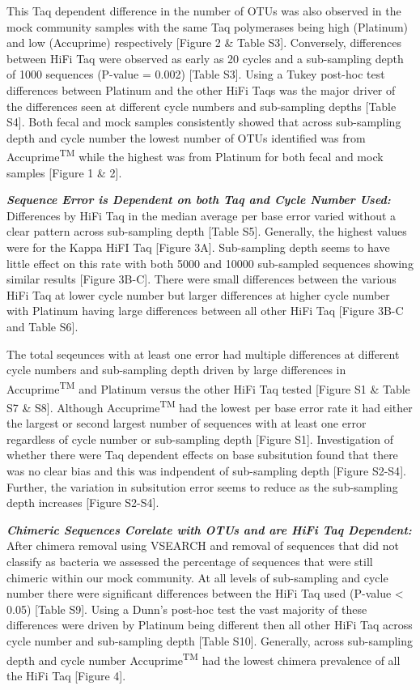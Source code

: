\documentclass[12pt,]{article}
\begin{document}
This Taq dependent difference in the number of OTUs was also observed in
the mock community samples with the same Taq polymerases being high
(Platinum) and low (Accuprime) respectively {[}Figure 2 \& Table S3{]}.
Conversely, differences between HiFi Taq were observed as early as 20
cycles and a sub-sampling depth of 1000 sequences (P-value = 0.002)
{[}Table S3{]}. Using a Tukey post-hoc test differences between Platinum
and the other HiFi Taqs was the major driver of the differences seen at
different cycle numbers and sub-sampling depths {[}Table S4{]}. Both
fecal and mock samples consistently showed that across sub-sampling
depth and cycle number the lowest number of OTUs identified was from
Accuprime\textsuperscript{TM} while the highest was from Platinum for
both fecal and mock samples {[}Figure 1 \& 2{]}.

\textbf{\emph{Sequence Error is Dependent on both Taq and Cycle Number
Used:}} Differences by HiFi Taq in the median average per base error
varied without a clear pattern across sub-sampling depth {[}Table S5{]}.
Generally, the highest values were for the Kappa HiFI Taq {[}Figure
3A{]}. Sub-sampling depth seems to have little effect on this rate with
both 5000 and 10000 sub-sampled sequences showing similar results
{[}Figure 3B-C{]}. There were small differences between the various HiFi
Taq at lower cycle number but larger differences at higher cycle number
with Platinum having large differences between all other HiFi Taq
{[}Figure 3B-C and Table S6{]}.

The total seqeunces with at least one error had multiple differences at
different cycle numbers and sub-sampling depth driven by large
differences in Accuprime\textsuperscript{TM} and Platinum versus the
other HiFi Taq tested {[}Figure S1 \& Table S7 \& S8{]}. Although
Accuprime\textsuperscript{TM} had the lowest per base error rate it had
either the largest or second largest number of sequences with at least
one error regardless of cycle number or sub-sampling depth {[}Figure
S1{]}. Investigation of whether there were Taq dependent effects on base
subsitution found that there was no clear bias and this was indpendent
of sub-sampling depth {[}Figure S2-S4{]}. Further, the variation in
subsitution error seems to reduce as the sub-sampling depth increases
{[}Figure S2-S4{]}.

\textbf{\emph{Chimeric Sequences Corelate with OTUs and are HiFi Taq
Dependent:}} After chimera removal using VSEARCH and removal of
sequences that did not classify as bacteria we assessed the percentage
of sequences that were still chimeric within our mock community. At all
levels of sub-sampling and cycle number there were significant
differences between the HiFi Taq used (P-value \textless{} 0.05)
{[}Table S9{]}. Using a Dunn's post-hoc test the vast majority of these
differences were driven by Platinum being different then all other HiFi
Taq across cycle number and sub-sampling depth {[}Table S10{]}.
Generally, across sub-sampling depth and cycle number
Accuprime\textsuperscript{TM} had the lowest chimera prevalence of all
the HiFi Taq {[}Figure 4{]}.
\end{document}
